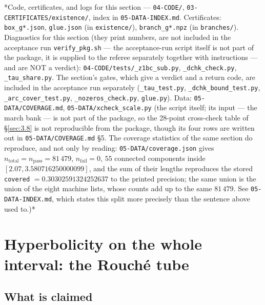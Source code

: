 *Code, certificates, and logs for this section --- \texttt{04-CODE/}, \texttt{03-\allowbreak CERTIFICATES/\allowbreak existence/\allowbreak }, index in \texttt{05-\allowbreak DATA-\allowbreak INDEX.md}. Certificates: \texttt{box\_g*.json}, \texttt{glue.json} (in \texttt{existence/}), \texttt{branch\_g*.npz} (in \texttt{branches/}). Diagnostics for this section (they print numbers, are not included in the acceptance run \texttt{verify\_\allowbreak pkg.sh} --- the acceptance-run script itself is not part of the package, it is supplied to the referee separately together with instructions --- and are NOT a verdict): \texttt{04-\allowbreak CODE/\allowbreak tests/\allowbreak \_\allowbreak z1bc\_\allowbreak sub.py}, \texttt{\_\allowbreak dchk\_\allowbreak check.py}, \texttt{\_\allowbreak tau\_\allowbreak share.py}. The section's gates, which give a verdict and a return code, are included in the acceptance run separately (\texttt{\_\allowbreak tau\_\allowbreak test.py}, \texttt{\_\allowbreak dchk\_\allowbreak bound\_\allowbreak test.py}, \texttt{\_\allowbreak arc\_\allowbreak cover\_\allowbreak test.py}, \texttt{\_\allowbreak nozeros\_\allowbreak check.py}, \texttt{glue.py}). Data: \texttt{05-\allowbreak DATA/\allowbreak COVERAGE.md}, \texttt{05-\allowbreak DATA/\allowbreak xcheck\_\allowbreak scale.py} (the script itself; its input --- the march bank --- is not part of the package, so the 28-point cross-check table of \S\ref{sec:3.8} is not reproducible from the package, though its four rows are written out in \texttt{05-\allowbreak DATA/\allowbreak COVERAGE.md} \S5. The coverage statistics of the same section do reproduce, and not only by reading: \texttt{05-\allowbreak DATA/\allowbreak coverage.json} gives $n_{\mathrm{total}} = n_{\mathrm{pass}} = 81\,479$, $n_{\mathrm{fail}} = 0$, $55$ connected components inside $[2.07, 3.580716250000099]$, and the sum of their lengths reproduces the stored \texttt{covered} $= 0.30302591324252637$ to the printed precision; the same union is the union of the eight machine lists, whose counts add up to the same $81\,479$. See \texttt{05-\allowbreak DATA-\allowbreak INDEX.md}, which states this split more precisely than the sentence above used to.)*



\section{Hyperbolicity on the whole interval: the Rouché tube}\label{sec:4}


\subsection{What is claimed}\label{sec:4.1}

